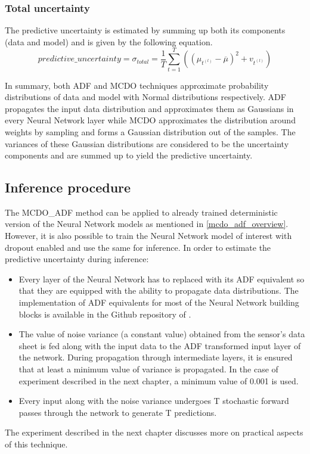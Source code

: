 	\subsubsection{Total uncertainty}
	The predictive uncertainty is estimated by summing up both its components (data and model) and is given by the following equation.
	\begin{equation}
		predictive\_uncertainty = \sigma_{total} =  \frac{1}{T}\sum_{t=1}^{T}((\mu_{t^{(l)}}-\overline{\mu})^2 + v_{t^{(l)}})
	\end{equation}
	
	
	In summary, both ADF and MCDO techniques approximate probability distributions of data and model with Normal distributions respectively. ADF propagates the input data distribution and approximates them as Gaussians in every Neural Network layer while MCDO approximates the distribution around weights by sampling and forms a Gaussian distribution out of the samples. The variances of these Gaussian distributions are considered to be the uncertainty components and are summed up to yield the predictive uncertainty.
	
	\subsection{Inference procedure}\label{sec_mcdo_adf}
	The MCDO\_ADF method can be applied to already trained deterministic version of the Neural Network models as mentioned in \ref{mcdo_adf_overview}. However, it is also possible to train the Neural Network model of interest with dropout enabled and use the same for inference.
	In order to estimate the predictive uncertainty during inference:
	\begin{itemize}
		\item Every layer of the Neural Network has to replaced with its ADF equivalent so that they are equipped with the ability to propagate data distributions. The implementation of ADF equivalents for most of the Neural Network building blocks is available in the Github repository of \cite{gast2018lightweight}.
		\item The value of noise variance (a constant value) obtained from the sensor's data sheet is fed along with the input data to the ADF transformed input layer of the network. During propagation through intermediate layers, it is ensured that at least a minimum value of variance is propagated. In the case of experiment described in the next chapter, a minimum value of 0.001 is used.
		\item Every input along with the noise variance undergoes T stochastic forward passes through the network to generate T predictions.  
	\end{itemize}
	The experiment described in the next chapter discusses more on practical aspects of this technique.    
